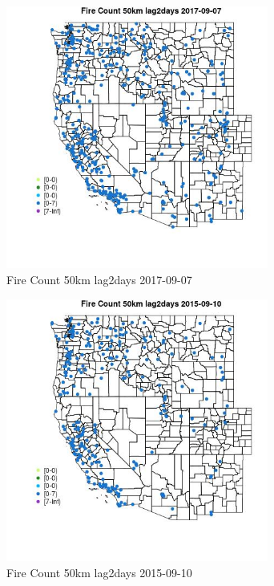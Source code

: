 \begin{figure} 
\centering  
\includegraphics[width=0.77\textwidth]{Code_Outputs/Report_ML_input_PM25_Step4_part_e_de_duplicated_aves_compiled_2019-05-20wNAs_MapObsFire_Count_50km_lag2days2017-09-07.jpg} 
\caption{\label{fig:Report_ML_input_PM25_Step4_part_e_de_duplicated_aves_compiled_2019-05-20wNAsMapObsFire_Count_50km_lag2days2017-09-07}Fire Count 50km lag2days 2017-09-07} 
\end{figure} 
 

\begin{figure} 
\centering  
\includegraphics[width=0.77\textwidth]{Code_Outputs/Report_ML_input_PM25_Step4_part_e_de_duplicated_aves_compiled_2019-05-20wNAs_MapObsFire_Count_50km_lag2days2015-09-10.jpg} 
\caption{\label{fig:Report_ML_input_PM25_Step4_part_e_de_duplicated_aves_compiled_2019-05-20wNAsMapObsFire_Count_50km_lag2days2015-09-10}Fire Count 50km lag2days 2015-09-10} 
\end{figure} 
 

